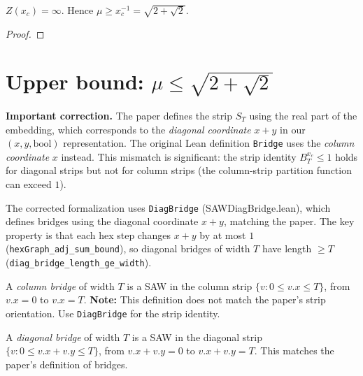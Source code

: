 \begin{theorem}\label{thm:lower_bound}
\leanok
{}
  $Z(x_c) = \infty$. Hence $\mu \geq x_c^{-1} = \sqrt{2+\sqrt{2}}$.
\end{theorem}
\begin{proof}
\leanok
\end{proof}


\section{Upper bound: $\mu \leq \sqrt{2+\sqrt{2}}$}

\begin{remark}\label{rem:coord_system}
  \textbf{Important correction.}
  The paper defines the strip $S_T$ using the real part of the embedding, which
  corresponds to the \emph{diagonal coordinate} $x + y$ in our $(x, y, \mathrm{bool})$
  representation. The original Lean definition \texttt{Bridge} uses the
  \emph{column coordinate} $x$ instead. This mismatch is significant: the
  strip identity $B_T^{x_c} \leq 1$ holds for diagonal strips but not for
  column strips (the column-strip partition function can exceed $1$).

  The corrected formalization uses \texttt{DiagBridge} (SAWDiagBridge.lean),
  which defines bridges using the diagonal coordinate $x + y$, matching the paper.
  The key property is that each hex step changes $x + y$ by at most $1$
  (\texttt{hexGraph\_adj\_sum\_bound}), so diagonal bridges of width $T$
  have length $\geq T$ (\texttt{diag\_bridge\_length\_ge\_width}).
\end{remark}

\begin{definition}\label{def:bridge}
\leanok
{}
  A \emph{column bridge} of width $T$ is a SAW in the column strip
  $\{v : 0 \leq v.x \leq T\}$, from $v.x = 0$ to $v.x = T$.
  \textbf{Note:} This definition does not match the paper's strip orientation.
  Use \texttt{DiagBridge} for the strip identity.
\end{definition}

\begin{definition}\label{def:diag_bridge}
\leanok
{}
  A \emph{diagonal bridge} of width $T$ is a SAW in the diagonal strip
  $\{v : 0 \leq v.x + v.y \leq T\}$, from $v.x + v.y = 0$ to $v.x + v.y = T$.
  This matches the paper's definition of bridges.
\end{definition}

